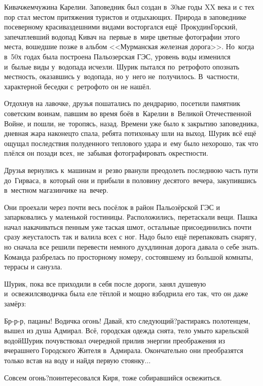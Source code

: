 Кивач\mdash жемчужина Карелии. Заповедник был создан в~30\sdash ые годы XX века и с тех пор стал местом притяжения туристов и отдыхающих. Природа в заповеднике по\sdash северному красива\mdash здешними видами восторгался ещё~Прокудин\sdash Горский, запечатлевший водопад Кивач на~первые в~мире цветные фотографии этого места, вошедшие позже в альбом <<Мурманская железная дорога>>. Но~когда в~50\sdash х годах была построена Пальозерская ГЭС, уровень воды изменился и~былые виды у~водопада исчезли. Шурик пытался по~ретро\sdash фото\cite{ПрокудинГорский} опознать местность, оказавшись у~водопада, но у~него не~получилось. В~частности, характерной беседки с~ретро\sdash фото он не нашёл.

Отдохнув на лавочке, друзья пошатались по дендрарию, посетили памятник советским воинам, павшим во время боёв в~Карелии в~Великой Отечественной Войне, и пошли, не~торопясь, назад. Времени уже было к закрытию заповедника, дневная жара наконец\sdash то спала, ребята потихоньку шли на выход. Шурик всё ещё ощущал последствия полуденного теплового удара и~ему было нехорошо, так что плёлся он позади всех, не~забывая фотографировать окрестности. 

Друзья вернулись к~машинам и~резво рванули преодолеть последнюю часть пути до~Гирваса, в~который они и прибыли в половину десятого~вечера, закупившись в~местном магазинчике на~вечер.

Они проехали через почти весь посёлок в район Пальозёрской ГЭС и запарковались у маленькой гостиницы. Расположились, перетаскали вещи. Пашка начал накачиваться пенным уже таская шмот, остальные присоединились почти сразу же\mdash усталость так и валила всех с ног. Надо было ещё перепаковать снарягу, но сначала все решили перевести немного дух\mdash длинная дорога давала о себе знать. Команда разбрелась по просторному номеру, состоявшему из большой комнаты, террасы и санузла. 

Шурик, пока все приходили в себя после дороги, занял душевую и~освежился\mdash водичка была еле тёплой и мощно взбодрила его так, что он даже замёрз:

\diagdash Бр-р-р, пацаны! Водичка огонь! Давай, кто следующий?\mdash растираясь полотенцем, вышел из душа Адмирал. Всё, городская одежда снята, тело умыто карельской водой\mdash Шурик почувствовал очередной прилив энергии преображения из вчерашнего Городского Жителя в~Адмирала. Окончательно они преобразятся только встав на воду и найдя первую стоянку$\ldots$

\diagdash Совсем огонь?\mdash поинтересовался Киря, тоже собиравшийся освежиться.

